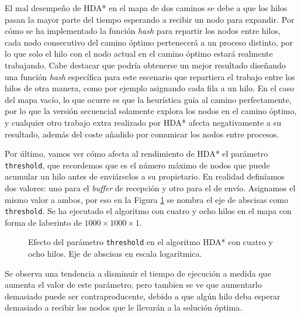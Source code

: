 \documentclass[a4paper,12pt]{article}
\begin{document}
El mal desempeño de HDA* en el mapa de dos caminos se debe a que los hilos pasan la mayor parte del tiempo esperando a recibir un nodo para expandir. Por cómo se ha implementado la función \textit{hash} para repartir los nodos entre hilos, cada nodo consecutivo del camino óptimo pertenecerá a un proceso distinto, por lo que solo el hilo con el nodo actual en el camino óptimo estará realmente trabajando. Cabe destacar que podría obtenerse un mejor resultado diseñando una función \textit{hash} específica para este escenario que repartiera el trabajo entre los hilos de otra manera, como por ejemplo asignando cada fila a un hilo. En el caso del mapa vacío, lo que ocurre es que la heurística guía al camino perfectamente, por lo que la versión secuencial solamente explora los nodos en el camino óptimo, y cualquier otro trabajo extra realizado por HDA* afecta negativamente a su resultado, además del coste añadido por comunicar los nodos entre procesos.

Por último, vamos ver cómo afecta al rendimiento de HDA* el parámetro \verb|threshold|, que recordemos que es el número máximo de nodos que puede acumular un hilo antes de enviárselos a su propietario. En realidad definíamos dos valores: uno para el \textit{buffer} de recepción y otro para el de envío. Asignamos el mismo valor a ambos, por eso en la Figura \ref{fig:threshold} se nombra el eje de abscisas como \verb|threshold|. Se ha ejecutado el algoritmo con cuatro y ocho hilos en el mapa con forma de laberinto de $1000 \times 1000 \times 1$.

\begin{figure}[H]
    \centering
    \begin{subfigure}[b]{0.49\textwidth}
        
    \end{subfigure}
    \hfill
    \begin{subfigure}[b]{0.49\textwidth}
        
    \end{subfigure}

    \caption{Efecto del parámetro \texttt{threshold} en el algoritmo HDA* con cuatro y ocho hilos. Eje de abscisas en escala logarítmica.}
    \label{fig:threshold}
\end{figure}

Se observa una tendencia a disminuir el tiempo de ejecución a medida que aumenta el valor de este parámetro, pero tambien se ve que aumentarlo demasiado puede ser contraproducente, debido a que algún hilo deba esperar demasiado a recibir los nodos que le llevarán a la solución óptima.
\end{document}
